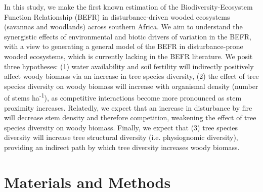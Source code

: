 \documentclass[11pt,a4paper]{article}
\begin{document}

In this study, we make the first known estimation of the Biodiversity-Ecosystem Function Relationship (BEFR) in disturbance-driven wooded ecosystems (savannas and woodlands) across southern Africa. We aim to understand the synergistic effects of environmental and biotic drivers of variation in the BEFR, with a view to generating a general model of the BEFR in disturbance-prone wooded ecosystems, which is currently lacking in the BEFR literature. We posit three hypotheses: (1) water availability and soil fertility will indirectly positively affect woody biomass via an increase in tree species diversity, (2) the effect of tree species diversity on woody biomass will increase with organismal density (number of stems ha\textsuperscript{-1}), as competitive interactions become more pronounced as stem proximity increases. Relatedly, we expect that an increase in disturbance by fire will decrease stem density and therefore competition, weakening the effect of tree species diversity on woody biomass. Finally, we expect that (3) tree species diversity will increase tree structural diversity (i.e. physiognomic diversity), providing an indirect path by which tree diversity increases woody biomass.

\section{Materials and Methods}
\end{document}
